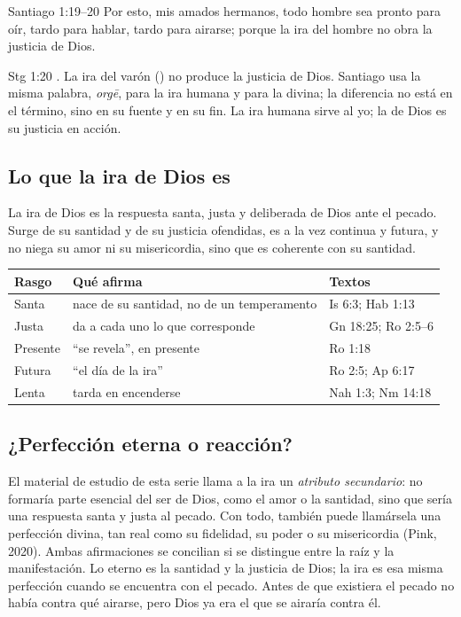 \begin{verso}{Santiago 1:19–20}
Por esto, mis amados hermanos, todo hombre sea pronto para oír, tardo para hablar, tardo para airarse; porque la ira del hombre no obra la justicia de Dios.
\end{verso}

\begin{filologiatexto}{Stg 1:20}
. La ira del varón () no produce la justicia de Dios. Santiago usa la misma palabra, \emph{orgē}, para la ira humana y para la divina; la diferencia no está en el término, sino en su fuente y en su fin. La ira humana sirve al yo; la de Dios es su justicia en acción.
\end{filologiatexto}

\subsection{Lo que la ira de Dios es}
\begin{tcolorbox}[colback=papiro,colframe=azul,boxrule=1pt,arc=3pt,fonttitle=\bfseries\small,title=Definición]
La ira de Dios es la respuesta santa, justa y deliberada de Dios ante el pecado. Surge de su santidad y de su justicia ofendidas, es a la vez continua y futura, y no niega su amor ni su misericordia, sino que es coherente con su santidad.
\end{tcolorbox}

\begin{center}\small\renewcommand{\arraystretch}{1.25}
\begin{tabular}{@{}L{2.6cm}L{7.4cm}L{4.4cm}@{}}
\toprule
\textbf{Rasgo} & \textbf{Qué afirma} & \textbf{Textos} \\ \midrule
Santa & nace de su santidad, no de un temperamento & Is 6:3; Hab 1:13 \\
Justa & da a cada uno lo que corresponde & Gn 18:25; Ro 2:5--6 \\
Presente & ``se revela'', en presente & Ro 1:18 \\
Futura & ``el día de la ira'' & Ro 2:5; Ap 6:17 \\
Lenta & tarda en encenderse & Nah 1:3; Nm 14:18 \\
\bottomrule
\end{tabular}\end{center}

\subsection{¿Perfección eterna o reacción?}
El material de estudio de esta serie llama a la ira un \emph{atributo secundario}: no formaría parte esencial del ser de Dios, como el amor o la santidad, sino que sería una respuesta santa y justa al pecado. Con todo, también puede llamársela una perfección divina, tan real como su fidelidad, su poder o su misericordia (Pink, 2020). Ambas afirmaciones se concilian si se distingue entre la raíz y la manifestación. Lo eterno es la santidad y la justicia de Dios; la ira es esa misma perfección cuando se encuentra con el pecado. Antes de que existiera el pecado no había contra qué airarse, pero Dios ya era el que se airaría contra él.

